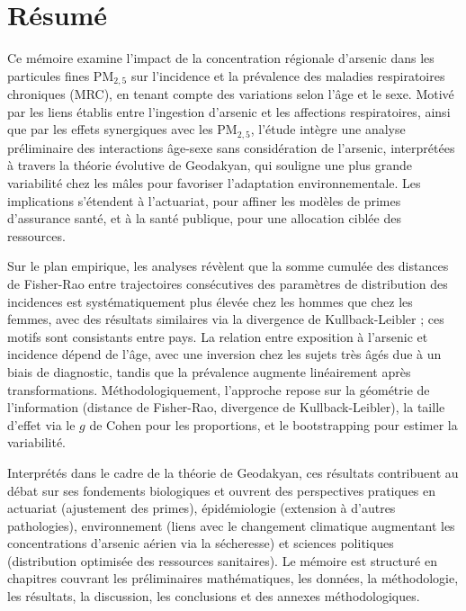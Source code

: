 \section{Résumé}

Ce mémoire examine l'impact de la concentration régionale d'arsenic dans les particules fines PM$_{2{,}5}$ sur l'incidence et la prévalence des maladies respiratoires chroniques (MRC), en tenant compte des variations selon l'âge et le sexe. Motivé par les liens établis entre l'ingestion d'arsenic et les affections respiratoires, ainsi que par les effets synergiques avec les PM$_{2{,}5}$, l'étude intègre une analyse préliminaire des interactions âge-sexe sans considération de l'arsenic, interprétées à travers la théorie évolutive de Geodakyan, qui souligne une plus grande variabilité chez les mâles pour favoriser l'adaptation environnementale. Les implications s'étendent à l'actuariat, pour affiner les modèles de primes d'assurance santé, et à la santé publique, pour une allocation ciblée des ressources.

Sur le plan empirique, les analyses révèlent que la somme cumulée des distances de Fisher-Rao entre trajectoires consécutives des paramètres de distribution des incidences est systématiquement plus élevée chez les hommes que chez les femmes, avec des résultats similaires via la divergence de Kullback-Leibler ; ces motifs sont consistants entre pays. La relation entre exposition à l'arsenic et incidence dépend de l'âge, avec une inversion chez les sujets très âgés due à un biais de diagnostic, tandis que la prévalence augmente linéairement après transformations. Méthodologiquement, l'approche repose sur la géométrie de l'information (distance de Fisher-Rao, divergence de Kullback-Leibler), la taille d'effet via le \( g \) de Cohen pour les proportions, et le bootstrapping pour estimer la variabilité.

Interprétés dans le cadre de la théorie de Geodakyan, ces résultats contribuent au débat sur ses fondements biologiques et ouvrent des perspectives pratiques en actuariat (ajustement des primes), épidémiologie (extension à d'autres pathologies), environnement (liens avec le changement climatique augmentant les concentrations d'arsenic aérien via la sécheresse) et sciences politiques (distribution optimisée des ressources sanitaires). Le mémoire est structuré en chapitres couvrant les préliminaires mathématiques, les données, la méthodologie, les résultats, la discussion, les conclusions et des annexes méthodologiques.